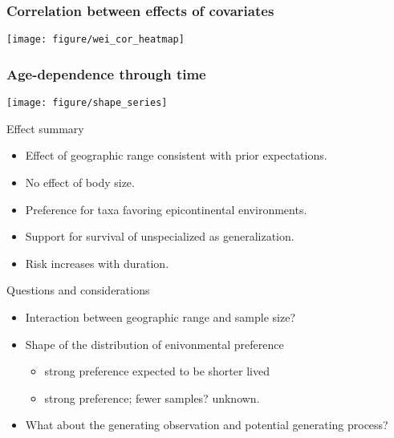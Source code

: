 \documentclass{beamer}
\begin{document}
\begin{frame}
  \frametitle{Correlation between effects of covariates}
  \texttt{[image: figure/wei\_cor\_heatmap]}
\end{frame}

\begin{frame}
  \frametitle{Age-dependence through time}
  \texttt{[image: figure/shape\_series]}
\end{frame}

\begin{frame}
  \begin{block}{Effect summary}
    \begin{itemize}
      \item Effect of geographic range consistent with prior expectations.
      \item No effect of body size.
      \item Preference for taxa favoring epicontinental environments.
      \item Support for survival of unspecialized as generalization.
      \item Risk increases with duration.
    \end{itemize}
  \end{block}
\end{frame}

\begin{frame}
  \begin{alertblock}{Questions and considerations}
    \begin{itemize}
      \item Interaction between geographic range and sample size?
      \item Shape of the distribution of enivonmental preference
        \begin{itemize}
          \item strong preference expected to be shorter lived
          \item strong preference; fewer samples? unknown.
        \end{itemize}
      \item What about the generating observation and potential generating process?
    \end{itemize}
  \end{alertblock}
\end{frame}
\end{document}
